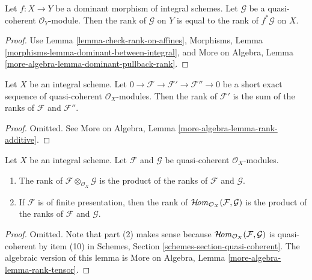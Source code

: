 \begin{lemma}
\label{lemma-dominant-pullback-rank}
Let $f : X \to Y$ be a dominant morphism of integral schemes.
Let $\mathcal{G}$ be a quasi-coherent $\mathcal{O}_Y$-module.
Then the rank of $\mathcal{G}$ on $Y$ is equal to the rank
of $f^*\mathcal{G}$ on $X$.
\end{lemma}

\begin{proof}
Use Lemma \ref{lemma-check-rank-on-affines},
Morphisms, Lemma \ref{morphisms-lemma-dominant-between-integral},
and
More on Algebra, Lemma \ref{more-algebra-lemma-dominant-pullback-rank}.
\end{proof}

\begin{lemma}
\label{lemma-rank-additive}
Let $X$ be an integral scheme.
Let $0 \to \mathcal{F} \to \mathcal{F}' \to \mathcal{F}'' \to 0$
be a short  exact sequence of quasi-coherent $\mathcal{O}_X$-modules.
Then the rank of $\mathcal{F}'$ is the sum of the ranks of
$\mathcal{F}$ and $\mathcal{F}''$.
\end{lemma}

\begin{proof}
Omitted. See More on Algebra, Lemma \ref{more-algebra-lemma-rank-additive}.
\end{proof}

\begin{lemma}
\label{lemma-rank-tensor}
Let $X$ be an integral scheme. Let
$\mathcal{F}$ and $\mathcal{G}$ be
quasi-coherent $\mathcal{O}_X$-modules.
\begin{enumerate}
\item The rank of $\mathcal{F} \otimes_{\mathcal{O}_X} \mathcal{G}$
is the product of the ranks of $\mathcal{F}$ and $\mathcal{G}$.
\item If $\mathcal{F}$ is of finite presentation, then
the rank of $\mathop{\mathcal{H}\!\mathit{om}}\nolimits_{\mathcal{O}_X}(\mathcal{F}, \mathcal{G})$
is the product of the ranks of $\mathcal{F}$ and $\mathcal{G}$.
\end{enumerate}
\end{lemma}

\begin{proof}
Omitted. Note that part (2) makes sense because
$\mathop{\mathcal{H}\!\mathit{om}}\nolimits_{\mathcal{O}_X}(\mathcal{F}, \mathcal{G})$
is quasi-coherent by item (10) in
Schemes, Section \ref{schemes-section-quasi-coherent}.
The algebraic version of this lemma is
More on Algebra, Lemma \ref{more-algebra-lemma-rank-tensor}.
\end{proof}

